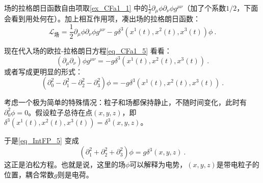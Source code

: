 场的拉格朗日函数自由项取\autoref{ex_CFa1_1} 中的$\frac{1}{2}\partial_\mu\phi\partial_\nu\phi g^{\mu\nu}$（加了个系数$1/2$，下面会看到用处何在）。加上相互作用项，凑出场的拉格朗日函数：
\begin{equation}
\mathcal{L}_{\text{场}} = \frac{1}{2}\partial_\mu\phi\partial_\nu\phi g^{\mu\nu} - g\delta^3(x^1(t), x^2(t), x^3(t))\phi~.
\end{equation}

现在代入场的欧拉-拉格朗日方程\autoref{eq_CFa1_5} 看看：
\begin{equation}
(\partial_\mu\partial_\nu)\phi g^{\mu\nu} = -g\delta^3(x^1(t), x^2(t), x^3(t))~.
\end{equation}
或者写成更明显的形式：
\begin{equation}\label{eq_IntFP_5}
(\partial_0^2-\partial_1^2-\partial_2^2-\partial_3^2)\phi = -g\delta^3(x^1(t), x^2(t), x^3(t))~.
\end{equation}

考虑一个极为简单的特殊情况：粒子和场都保持静止，不随时间变化，此时有$\partial_0^2\phi = 0$。假设粒子总待在点$(x, y, z)$，即$\delta^3(x^1(t), x^2(t), x^3(t))=\delta^3(x, y, z)$。

于是\autoref{eq_IntFP_5} 变成
\begin{equation}
(\partial_1^2+\partial_2^2+\partial_3^2)\phi = g\delta^3(x, y, z)~.
\end{equation}
这正是泊松方程。也就是说，这里的场$\phi$可以解释为电势，$(x, y, z)$是带电粒子的位置，耦合常数$g$则是电荷。















